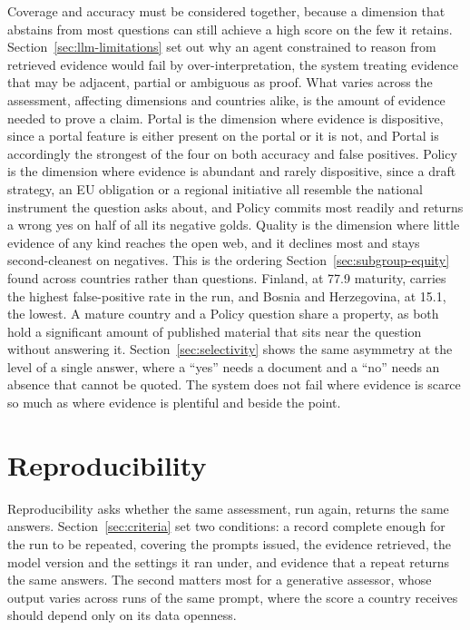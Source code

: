 Coverage and accuracy must be considered together, because a dimension that abstains from most questions can still achieve a high score on the few it retains. Section~\ref{sec:llm-limitations} set out why an agent constrained to reason from retrieved evidence would fail by over-interpretation, the system treating evidence that may be adjacent, partial or ambiguous as proof. What varies across the assessment, affecting dimensions and countries alike, is the amount of evidence needed to prove a claim. Portal is the dimension where evidence is dispositive, since a portal feature is either present on the portal or it is not, and Portal is accordingly the strongest of the four on both accuracy and false positives. Policy is the dimension where evidence is abundant and rarely dispositive, since a draft strategy, an EU obligation or a regional initiative all resemble the national instrument the question asks about, and Policy commits most readily and returns a wrong yes on half of all its negative golds. Quality is the dimension where little evidence of any kind reaches the open web, and it declines most and stays second-cleanest on negatives. This is the ordering Section~\ref{sec:subgroup-equity} found across countries rather than questions. Finland, at 77.9 maturity, carries the highest false-positive rate in the run, and Bosnia and Herzegovina, at 15.1, the lowest. A mature country and a Policy question share a property, as both hold a significant amount of published material that sits near the question without answering it. Section~\ref{sec:selectivity} shows the same asymmetry at the level of a single answer, where a ``yes'' needs a document and a ``no'' needs an absence that cannot be quoted. The system does not fail where evidence is scarce so much as where evidence is plentiful and beside the point.

\section{Reproducibility}\label{sec:reproducibility}

Reproducibility asks whether the same assessment, run again, returns the same answers. Section~\ref{sec:criteria} set two conditions: a record complete enough for the run to be repeated, covering the prompts issued, the evidence retrieved, the model version and the settings it ran under, and evidence that a repeat returns the same answers. The second matters most for a generative assessor, whose output varies across runs of the same prompt, where the score a country receives should depend only on its data openness.

